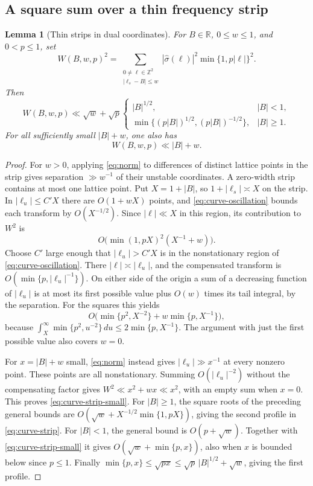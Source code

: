 \documentclass[11pt,a4paper,reqno]{amsart}
\newtheorem{lemma}[theorem]{Lemma}
\theoremstyle{definition}
\theoremstyle{remark}
\numberwithin{equation}{section}
\begin{document}
\subsection{A square sum over a thin frequency strip}
\begin{lemma}[Thin strips in dual coordinates]\label{lem:curve-strip}
For \(B\in\mathbb R\), \(0\le w\le1\), and \(0<p\le1\), set
\[
 W(B,w,p)^2
  =\sum_{\substack{0\ne\ell\in\mathbb Z^2\\|\ell_s-B|\le w}}
      |\widehat\sigma(\ell)|^2\min\{1,p|\ell|\}^2.
\]
Then
\begin{equation}\label{eq:curve-strip}
 W(B,w,p)\ll \sqrt w+\sqrt p
 \begin{cases}
      |B|^{1/2}, & |B|<1,\\
      \min\{(p|B|)^{1/2},(p|B|)^{-1/2}\}, & |B|\ge1 .
 \end{cases}
\end{equation}
For all sufficiently small \(|B|+w\), one also has
\begin{equation}\label{eq:curve-strip-small}
                  W(B,w,p)\ll |B|+w .
\end{equation}
\end{lemma}
\begin{proof}
For \(w>0\), applying \eqref{eq:norm} to differences of distinct
lattice points in the strip gives separation \(\gg w^{-1}\) of their
unstable coordinates. A zero-width strip contains at most one lattice
point. Put \(X=1+|B|\), so \(1+|\ell_s|\asymp X\) on the strip.
In \(|\ell_u|\le C'X\) there are \(O(1+wX)\) points, and
\eqref{eq:curve-oscillation} bounds each transform by \(O(X^{-1/2})\).
Since \(|\ell|\ll X\) in this region, its contribution to \(W^2\) is
\[
               O\bigl(\min(1,pX)^2(X^{-1}+w)\bigr).
\]
Choose \(C'\) large enough that \(|\ell_u|>C'X\) is in the nonstationary
region of \eqref{eq:curve-oscillation}. There \(|\ell|\asymp|\ell_u|\),
and the compensated transform is \(O(\min\{p,|\ell_u|^{-1}\})\).
On either side of the origin a sum of a decreasing function of
\(|\ell_u|\) is at most its first possible value plus \(O(w)\) times
its tail integral, by the separation. For the squares this yields
\[
 O\bigl(\min\{p^2,X^{-2}\}+w\min\{p,X^{-1}\}\bigr),
\]
because \(\int_X^\infty\min\{p^2,u^{-2}\}\,du\le2\min\{p,X^{-1}\}\).
The argument with just the first possible value also covers \(w=0\).

For \(x=|B|+w\) small, \eqref{eq:norm} instead gives
\(|\ell_u|\gg x^{-1}\) at every nonzero point. These points are all
nonstationary. Summing \(O(|\ell_u|^{-2})\) without the compensating
factor gives \(W^2\ll x^2+wx\ll x^2\), with an empty sum when \(x=0\).
This proves \eqref{eq:curve-strip-small}. For \(|B|\ge1\), the square
roots of the preceding general bounds are
\(O(\sqrt w+X^{-1/2}\min\{1,pX\})\), giving the second profile in
\eqref{eq:curve-strip}. For \(|B|<1\), the general bound is
\(O(p+\sqrt w)\). Together with \eqref{eq:curve-strip-small} it gives
\(O(\sqrt w+\min\{p,x\})\), also when \(x\) is bounded below since
\(p\le1\). Finally \(\min\{p,x\}\le\sqrt{px}\le\sqrt p\,|B|^{1/2}
+\sqrt w\), giving the first profile.
\end{proof}
\end{document}
